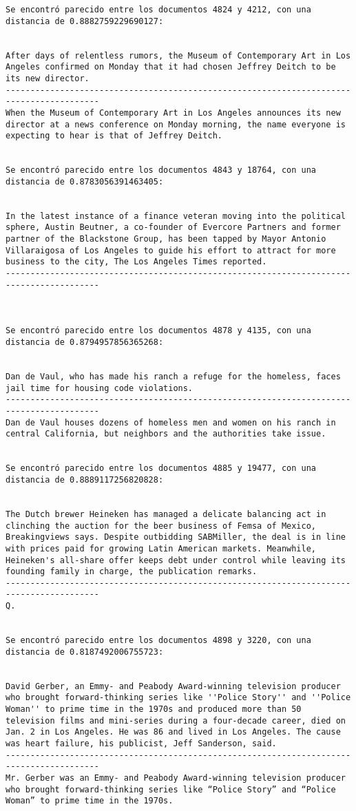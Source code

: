 \documentclass[11pt]{article}
\begin{document}
\begin{Verbatim}[commandchars=\\\{\}]
Se encontró parecido entre los documentos 4824 y 4212, con una distancia de 0.8882759229690127:


After days of relentless rumors, the Museum of Contemporary Art in Los Angeles confirmed on Monday that it had chosen Jeffrey Deitch to be its new director.
-----------------------------------------------------------------------------------------
When the Museum of Contemporary Art in Los Angeles announces its new director at a news conference on Monday morning, the name everyone is expecting to hear is that of Jeffrey Deitch.


Se encontró parecido entre los documentos 4843 y 18764, con una distancia de 0.8783056391463405:


In the latest instance of a finance veteran moving into the political sphere, Austin Beutner, a co-founder of Evercore Partners and former partner of the Blackstone Group, has been tapped by Mayor Antonio Villaraigosa of Los Angeles to guide his effort to attract for more business to the city, The Los Angeles Times reported.
-----------------------------------------------------------------------------------------



Se encontró parecido entre los documentos 4878 y 4135, con una distancia de 0.8794957856365268:


Dan de Vaul, who has made his ranch a refuge for the homeless, faces jail time for housing code violations.
-----------------------------------------------------------------------------------------
Dan de Vaul houses dozens of homeless men and women on his ranch in central California, but neighbors and the authorities take issue.


Se encontró parecido entre los documentos 4885 y 19477, con una distancia de 0.8889117256820828:


The Dutch brewer Heineken has managed a delicate balancing act in clinching the auction for the beer business of Femsa of Mexico, Breakingviews says. Despite outbidding SABMiller, the deal is in line with prices paid for growing Latin American markets. Meanwhile, Heineken's all-share offer keeps debt under control while leaving its founding family in charge, the publication remarks.
-----------------------------------------------------------------------------------------
Q.


Se encontró parecido entre los documentos 4898 y 3220, con una distancia de 0.8187492006755723:


David Gerber, an Emmy- and Peabody Award-winning television producer who brought forward-thinking series like ''Police Story'' and ''Police Woman'' to prime time in the 1970s and produced more than 50 television films and mini-series during a four-decade career, died on Jan. 2 in Los Angeles. He was 86 and lived in Los Angeles. The cause was heart failure, his publicist, Jeff Sanderson, said.
-----------------------------------------------------------------------------------------
Mr. Gerber was an Emmy- and Peabody Award-winning television producer who brought forward-thinking series like “Police Story” and “Police Woman” to prime time in the 1970s.



\end{Verbatim}
\end{document}
